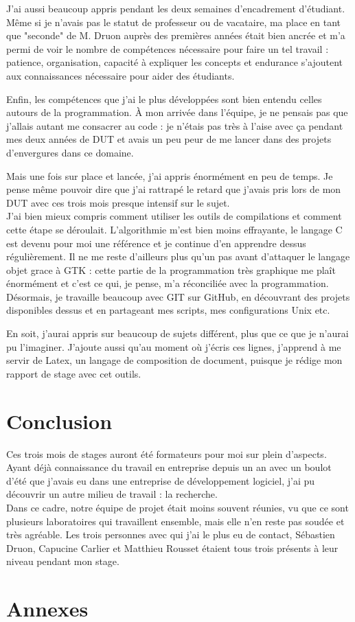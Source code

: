 \documentclass[11pt,french,a4paper]{report}
\begin{document}
J'ai aussi beaucoup appris pendant les deux semaines d'encadrement d'étudiant. Même si je n'avais pas le statut de professeur 
ou de vacataire, ma place en tant que "seconde" de M. Druon auprès des premières années était bien ancrée 
et m'a permi de voir le nombre de compétences nécessaire pour faire un tel travail : patience, organisation, 
capacité à expliquer les concepts et endurance s'ajoutent aux connaissances nécessaire pour aider des étudiants. 


Enfin, les compétences que j'ai le plus développées sont bien entendu celles autours de la programmation. 
À mon arrivée dans l'équipe, je ne pensais pas que j'allais autant me consacrer au code : je n'étais pas très à l'aise avec ça 
pendant mes deux années de DUT et avais un peu peur de me lancer dans des projets d'envergures dans ce domaine. 

Mais une fois sur place et lancée, j'ai appris énormément en peu de temps. Je pense même pouvoir dire que j'ai rattrapé le retard 
que j'avais pris lors de mon DUT avec ces trois mois presque intensif sur le sujet. \\

J'ai bien mieux compris comment utiliser les outils de compilations et comment cette étape se déroulait. L'algorithmie m'est bien moins
effrayante, le langage C est devenu pour moi une référence et je continue d'en apprendre dessus régulièrement. 
Il ne me reste d'ailleurs plus qu'un pas avant d'attaquer le langage objet grace à GTK : cette partie de la programmation très graphique
me plaît énormément et c'est ce qui, je pense, m'a réconciliée avec la programmation. \\

Désormais, je travaille beaucoup avec GIT sur GitHub, en découvrant des projets disponibles dessus et en partageant mes scripts,
mes configurations Unix etc. 

En soit, j'aurai appris sur beaucoup de sujets différent, plus que ce que je n'aurai pu l'imaginer.
J'ajoute aussi qu'au moment où j'écris ces lignes, j'apprend à me servir de Latex, un langage de composition de document, 
puisque je rédige mon rapport de stage avec cet outils. 


\chapter{Conclusion}

Ces trois mois de stages auront été formateurs pour moi sur plein d'aspects. Ayant déjà connaissance du travail en entreprise depuis un an
avec un boulot d'été que j'avais eu dans une entreprise de développement logiciel, j'ai pu découvrir un autre milieu de travail : 
la recherche. \\
Dans ce cadre, notre équipe de projet était moins souvent réunies, vu que ce sont plusieurs laboratoires qui travaillent ensemble, 
mais elle n'en reste pas soudée et très agréable. Les trois personnes avec qui j'ai le plus eu de contact, Sébastien Druon, 
Capucine Carlier et Matthieu Rousset étaient tous trois présents à leur niveau pendant mon stage.  \\

\chapter{Annexes}
\end{document}

